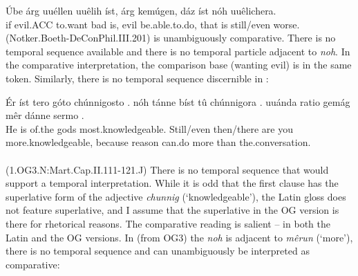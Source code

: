 \documentclass[output=paper]{langsci/langscibook}
\begin{document}
\ea\gll Úbe árg uuéllen uuêlih íst, árg kemúgen, dáz íst nóh uuêlichera.\\
       if evil.ACC to.want bad is, evil be.able.to.do, that is still/even worse.\\%
\label{OG3_noch_schlimmer} \hfill (Notker.Boeth-DeConPhil.III.201)
\z
{} is unambiguously comparative. There is no temporal sequence available and there is no temporal particle adjacent to \textit{noh}. In the comparative interpretation, the comparison base (wanting evil) is in the same token. Similarly, there is no temporal sequence discernible in :

\ea\gll Ér íst tero góto {chúnnigosto .} nóh tánne bíst tû {chúnnigora .} uuánda ratio gemág mêr dánne {sermo .}\\
       He is of.the gods most.knowledgeable. Still/even then/there are you more.knowledgeable, because reason can.do more than the.conversation.\\
\label{OG3_noch_wissend} \\ \hfill  (1.OG3.N:Mart.Cap.II.111-121.J)
\z
There is no temporal sequence that would support a temporal interpretation. While it is odd that the first clause has the superlative form of the adjective \textit{chunnig} (`knowledgeable'), the Latin gloss does not feature superlative, and I assume that the superlative in the OG version is there for rhetorical reasons. The comparative reading is salient -- in both the Latin and the OG versions. In  (from OG3) the \textit{noh} is adjacent to \textit{mêrun} (`more'), there is no temporal sequence and  can unambiguously be interpreted as comparative:
\end{document}
